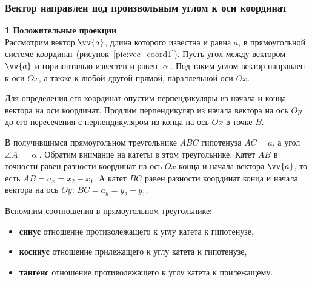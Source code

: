 \subsubsection{Вектор направлен под произвольным углом к оси координат}
\textbf{1 Положительные проекции}\\
Рассмотрим вектор $\vv{a}$, длина которого известна и равна $a$,
в прямоугольной системе координат (рисунок~\ref{pic:vec_coord1}).
Пусть угол между вектором $\vv{a}$ и горизонталью известен и равен $\upalpha$.
Под таким углом вектор направлен к оси $Ox$, а также к любой другой прямой,
параллельной оси $Ox$.

Для определения его координат опустим перпендикуляры из начала и конца вектора
на оси координат. Продлим перпендикуляр из начала вектора на ось $Oy$ до его пересечения
с перпендикуляром из конца на ось $Ox$ в точке $B$.

В получившимся прямоугольном треугольнике $ABC$ гипотенуза $AC = a$, а угол $\angle A = \upalpha$.
Обратим внимание на катеты в этом треугольнике.
Катет $AB$ в точности равен разности координат на ось $Ox$ конца и начала вектора $\vv{a}$, то есть
$AB = a_x = x_2-x_1$. А катет $BC$ равен разности координат
конца и начала вектора на ось $Oy$: $BC = a_y = y_2-y_1$.

Вспомним соотношения в прямоугольном треугольнике:
\begin{itemize}
\item \textbf{синус} \bdash отношение противолежащего к углу катета к гипотенузе,
\item \textbf{косинус} \bdash отношение прилежащего к углу катета к гипотенузе,
\item \textbf{тангенс} \bdash отношение противолежащего к углу катета к прилежащему.
\end{itemize}

